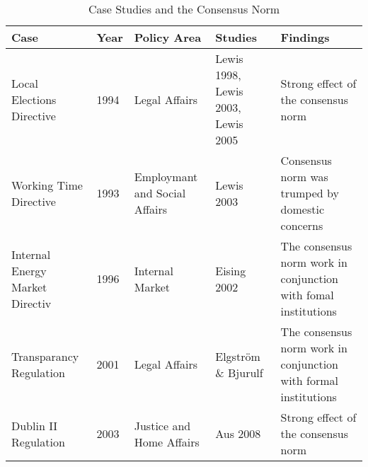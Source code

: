 \begin{table}[htp]
  \centering
 \begin{tabular}{p{2cm} l p{2cm}  p{2cm} p{2cm}} \toprule
    Case & Year & Policy Area & Studies & Findings \\ \midrule
    Local Elections Directive & 1994 & Legal Affairs & Lewis 1998, Lewis 2003, Lewis 2005 & Strong effect of the consensus norm \\
    Working Time Directive & 1993 & Employmant and Social Affairs & Lewis 2003 & Consensus norm was trumped by domestic concerns \\
    Internal Energy Market Directiv & 1996 & Internal Market & Eising 2002 & The consensus norm work in conjunction with fomal institutions \\
    Transparancy Regulation & 2001 & Legal Affairs & Elgstr\"{o}m \& Bjurulf & The consensus norm work in conjunction with formal institutions \\
    Dublin II Regulation & 2003 & Justice and Home Affairs &Aus 2008 & Strong effect of the consensus norm \\ \bottomrule 
  \end{tabular}
  \caption{Case Studies and the Consensus Norm}
  \label{tab:casestudies}
\end{table}



